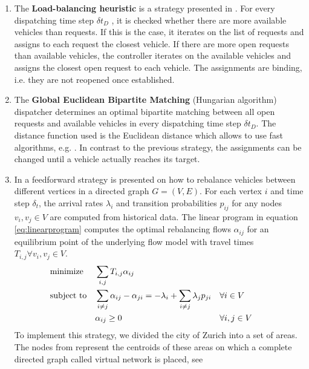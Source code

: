 \begin{enumerate}
\item The \textbf{Load-balancing heuristic} is a strategy presented in \cite{bischoff2016simulation}.
For every dispatching time step $\delta t_D$ , it is checked whether there are more available vehicles than requests.
If this is the case, it iterates on the list of requests and assigns to each request the closest vehicle. If there are more open
requests than available vehicles, the controller iterates on the available vehicles and assigns the closest open request to each vehicle.
The assignments are binding, i.e. they are not reopened once established.
\item The \textbf{Global Euclidean Bipartite Matching} (Hungarian algorithm) dispatcher determines an optimal bipartite
matching between all open requests and available vehicles in every dispatching time step
$\delta t_D$. The distance function used is the Euclidean distance which allows to use fast
algorithms, e.g. \cite{agarwal2004near}. In contrast to the previous strategy, the
assignments can be changed until a vehicle actually reaches its target.
\item In \cite{pavone2011load} a feedforward strategy is presented on how to rebalance vehicles between different vertices
in a directed graph $G = (V,E)$. For each vertex $i$ and time step $\delta_t$, the arrival rates $\lambda_i$ and transition probabilities $p_{ij}$ for
any nodes $v_i, v_j \in V$  are computed from historical data. The linear program in equation \ref{eq:linearprogram}
computes the optimal rebalancing flows $\alpha _{ij}$ for an equilibrium point of the underlying flow
model with travel times $T_{i,j} \forall v_i, v_j \in V$.
\begin{align}
&\textnormal{minimize}& &\sum_{i,j} T_{i,j} \alpha _{ij} & && && \nonumber \\
&\textnormal{subject to}&
&\sum_{i \neq j} \alpha _{ij} - \alpha _{ji} =-\lambda_i  + \sum_{i \neq j} \lambda_j p_{ji}
& &\forall i \in V &\label{eq:linearprogram} \\
&& &\alpha_{ij} \geq 0& & \forall i, j \in V& \nonumber
\end{align}
To implement this strategy, we divided the city of Zurich into a set of areas.
The nodes from \cite{pavone2011load} represent the centroids of these areas on
which a complete directed graph called virtual network is placed, see

\end{enumerate}
